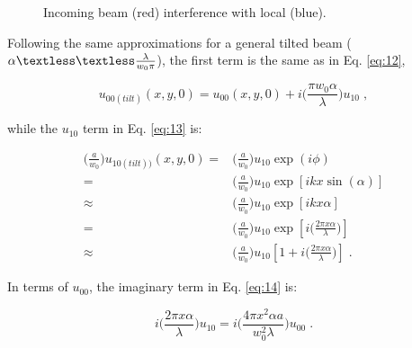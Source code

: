 \documentclass[aps,twoside,secnumarabic,balancelastpage,amsmath,amssymb,nofootinbib,hyperref=pdftex]{revtex4}
\newcommand{\bigfrac}[2]{\Big( \frac{#1}{#2}\Big)}
\begin{document}
	\begin{figure}[hb]
	\centering
	\caption{Incoming beam (red) interference with local (blue).}
	\end{figure}

Following the same approximations for a general tilted beam ($\alpha \textless\textless \frac{\lambda}{w_{0}\pi}$), the first term is the same as in Eq. \ref{eq:12},

	\begin{equation} \nonumber
			u_{00 (tilt)}(x,y,0) 
			= u_{00}(x,y,0) + i  \bigfrac{\pi w_{0} \alpha}{\lambda}u_{10} \; , 
	\end{equation}

while the $u_{10}$ term in Eq. \ref{eq:13} is:

	\begin{align}\label{eq:14}
		\bigfrac{a}{w_0} u_{10 (tilt))}(x,y,0) 
			=& \bigfrac{a}{w_0} u_{10}\exp(i \phi)
		\nonumber\\	
			= & \bigfrac{a}{w_0} u_{10} \exp \left[ikx \sin(\alpha) \right] 
		\nonumber\\	
			\approx & 
			\bigfrac{a}{w_0}u_{10} \exp \left[ ikx\alpha \right]
		\nonumber\\
			= & \bigfrac{a}{w_0}u_{10} \exp \left[ i \bigfrac{2 \pi x \alpha}{\lambda} \right]
		\nonumber\\ 
			\approx & 
			\bigfrac{a}{w_0} 
			u_{10} 
			 \left[
			1 + i \bigfrac{2 \pi x \alpha}{\lambda} \right]
			\;.
	\end{align}

In terms of $u_{00}$, the imaginary term in Eq. \ref{eq:14} is:

	\begin{equation}\label{eq:15}
		 i \bigfrac{2 \pi x \alpha}{\lambda}
		  u_{10} 
			= 
			i \bigfrac{4 \pi x^{2} \alpha a}{w_{0}^{2} \lambda} u_{00}  \;.
	\end{equation}
\end{document}
